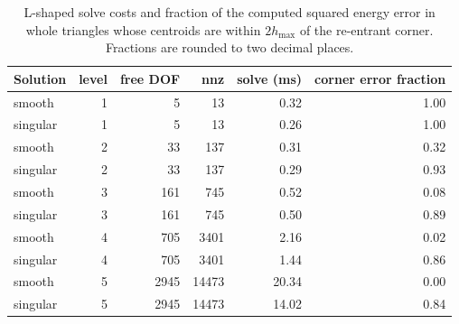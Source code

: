 \begin{table}[htbp]
\centering
\small
\setlength{\tabcolsep}{4pt}
\begin{tabular}{lrrrrr}
\toprule
Solution & level & free DOF & nnz & solve (ms) & corner error fraction \\
\midrule
smooth & 1 & 5 & 13 & 0.32 & 1.00 \\
singular & 1 & 5 & 13 & 0.26 & 1.00 \\
smooth & 2 & 33 & 137 & 0.31 & 0.32 \\
singular & 2 & 33 & 137 & 0.29 & 0.93 \\
smooth & 3 & 161 & 745 & 0.52 & 0.08 \\
singular & 3 & 161 & 745 & 0.50 & 0.89 \\
smooth & 4 & 705 & 3401 & 2.16 & 0.02 \\
singular & 4 & 705 & 3401 & 1.44 & 0.86 \\
smooth & 5 & 2945 & 14473 & 20.34 & 0.00 \\
singular & 5 & 2945 & 14473 & 14.02 & 0.84 \\
\bottomrule
\end{tabular}
\caption{L-shaped solve costs and fraction of the computed squared energy error in whole triangles whose centroids are within $2h_{\max}$ of the re-entrant corner. Fractions are rounded to two decimal places.}
\label{tab:depth-lshape-corner}
\end{table}
